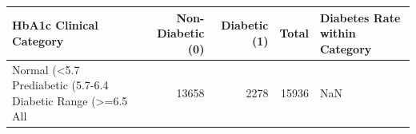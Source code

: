 \begin{tabular}{lrrrl}
\toprule
HbA1c Clinical Category & Non-Diabetic (0) & Diabetic (1) & Total & Diabetes Rate within Category \\
\midrule
Normal (<5.7%
Prediabetic (5.7-6.4%
Diabetic Range (>=6.5%
All & 13658 & 2278 & 15936 & NaN \\
\bottomrule
\end{tabular}
